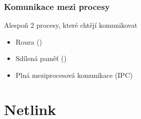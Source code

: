 


\subtitle{XII. Komunikace mezi procesy, část 2}

\date{10. 12. \the\year}


\shorthandoff{-}

\frame{\titlepage}


\begin{frame}
  \frametitle{Komunikace mezi procesy}

  Alespoň 2 procesy, které chtějí komunikovat

  \bigskip

  \begin{itemize}
    \item Roura ()
    \item Sdílená paměť ()
    \item Plná meziprocesová komunikace (IPC)
  \end{itemize}

  \pause
  \medskip

  \tableofcontents

\end{frame}

\section{Netlink}
\frame{\sectionpage}

